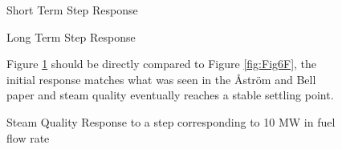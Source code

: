         \begin{figure}[ht]
            \begin{center}
                
                Short Term Step Response
                
                
                Long Term Step Response
                
                \caption{Steam Quality Response to a step corresponding to 10 MW in fuel flow rate}
                \label{fig:Valve_Open1D}
            \end{center}
            Figure \ref{fig:Valve_Open1D} should be directly compared to Figure \ref{fig:Fig6F}, the initial response matches what was seen in the \r{A}str\"{o}m and Bell paper and steam quality eventually reaches a stable settling point.
        \end{figure}  %
        
